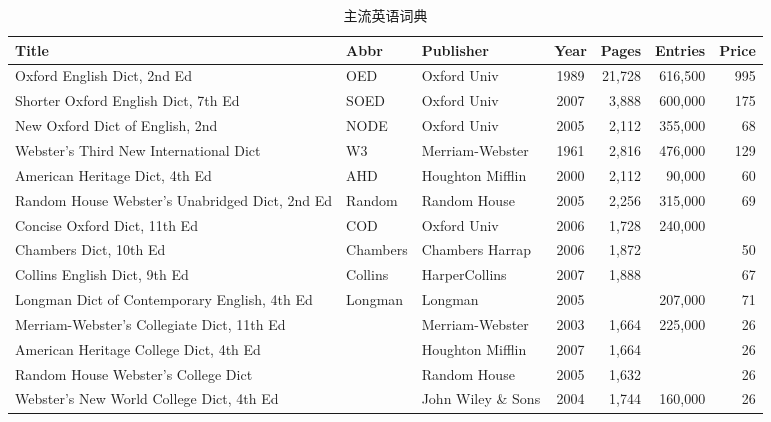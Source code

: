 \begin{sidewaystable}[htbp]
\caption{主流英语词典}
\label{tab:dict}
\centering
\begin{tabularx}{550pt}{Xllcrrr}
  \toprule
  Title & Abbr & Publisher & Year & Pages & Entries & Price \\
  \midrule
  Oxford English Dict, 2nd Ed & OED 
    & Oxford Univ & 1989 & 21,728 & 616,500 & 995 \\
  \midrule
  Shorter Oxford English Dict, 7th Ed & SOED 
    & Oxford Univ & 2007 & 3,888 & 600,000 & 175 \\
  New Oxford Dict of English, 2nd & NODE 
    & Oxford Univ & 2005 & 2,112 & 355,000 & 68 \\
  Webster's Third New International Dict & W3 
    & Merriam-Webster & 1961 & 2,816 & 476,000 & 129 \\
  American Heritage Dict, 4th Ed & AHD 
    & Houghton Mifflin & 2000 & 2,112 & 90,000 & 60 \\
  Random House Webster's Unabridged Dict, 2nd Ed & Random 
    & Random House & 2005 & 2,256 & 315,000 & 69 \\
  \midrule
  Concise Oxford Dict, 11th Ed & COD 
    & Oxford Univ & 2006 & 1,728 & 240,000 & \\
  Chambers Dict, 10th Ed & Chambers 
    & Chambers Harrap & 2006 & 1,872 & & 50 \\
  Collins English Dict, 9th Ed & Collins 
    & HarperCollins & 2007 & 1,888 & & 67 \\
  Longman Dict of Contemporary English, 4th Ed & Longman 
    & Longman & 2005 & & 207,000 & 71 \\
  Merriam-Webster's Collegiate Dict, 11th Ed & 
    & Merriam-Webster & 2003 & 1,664 & 225,000 & 26 \\
  American Heritage College Dict, 4th Ed & 
    & Houghton Mifflin & 2007 & 1,664 & & 26 \\
  Random House Webster's College Dict & 
    & Random House & 2005 & 1,632 & & 26 \\
  Webster's New World College Dict, 4th Ed & 
    & John Wiley \& Sons & 2004 & 1,744 & 160,000 & 26 \\
  \bottomrule
\end{tabularx}
\end{sidewaystable}
